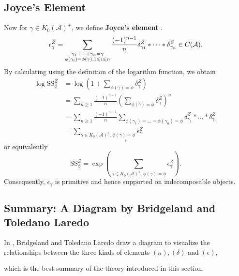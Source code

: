 \documentclass[a4paper,12pt]{amsart}
\newcommand{\Ss}{\mathrm{SS}}
\begin{document}
\subsection{Joyce's Element}
Now for $\gamma\in K_0(\mathcal{A})^+$, we define \textbf{Joyce's element} \cite{Joy2007}.
\[\epsilon^Z_\gamma=\sum_{\begin{subarray}{c}
    \\ \gamma_1+\dots+\gamma_n=\gamma\\ \phi(\gamma_i)=\phi(\gamma),1\leqslant i\leqslant n
\end{subarray}}\frac{(-1)^{n-1}}{n}\delta^Z_{\gamma_1}*\dots*\delta^Z_{\gamma_n}\in C(\mathcal{A}).\]
By calculating using the definition of the logarithm function, we obtain
\begin{align*}
    \log\Ss^Z_\phi&=\log\left(1+\sum_{ \phi(\gamma)=\phi}\delta^Z_\gamma\right)\\
    &=\sum_{n\geqslant1}\frac{(-1)^{n-1}}{n}\left(\sum_{\phi(\gamma)=\phi}\delta^Z_\gamma\right)^n\\
    &=\sum_{n\geqslant1}\frac{(-1)^{n-1}}{n}\sum_{\phi(\gamma_1)=\dots=\phi(\gamma_n)=\phi}\delta^Z_{\gamma_1}*\dots*\delta^Z_{\gamma_n}\\
    &=\sum_{\gamma\in K_0(\mathcal{A})^+,\phi(\gamma)=\phi}\epsilon^Z_\gamma
\end{align*}
\[,\]
or equivalently
\[\Ss^Z_\phi=\exp\left(\sum_{\gamma\in K_0(\mathcal{A})^+,\phi(\gamma)=\phi}\epsilon^Z_\gamma\right).\]
Consequently, $\epsilon_\gamma$ is primitive and hence supported on indecomposable objects.

\subsection{Summary: A Diagram by Bridgeland and Toledano Laredo}
In \cite{BT2012}, Bridgeland and Toledano Laredo draw a diagram to visualize the relationships between the three kinds of elements $(\kappa),(\delta)$ and $(\epsilon)$,
\begin{center}
\end{center}
which is the best summary of the theory introduced in this section.
\end{document}
